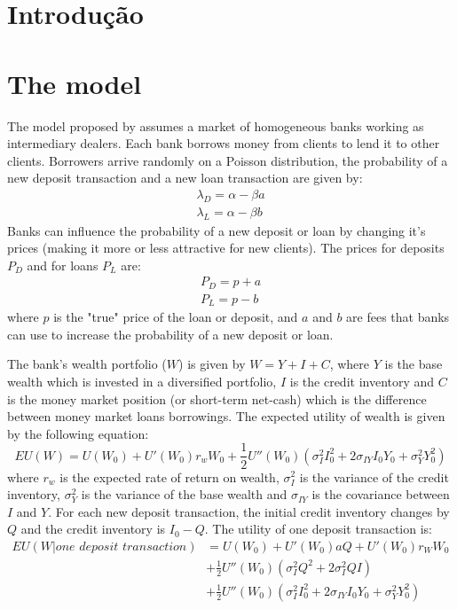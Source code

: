 \chapter{Introdução}


\chapter{The model}\label{cap_trabalho_academico}

The model proposed by  assumes a market of homogeneous banks working as intermediary dealers. Each bank borrows money from clients to lend it to other clients. Borrowers arrive randomly on a Poisson distribution, the probability of a new deposit transaction and a new loan transaction are given by: 
\begin{align}
  \lambda_D = \alpha - \beta a \\
  \lambda_L = \alpha - \beta b
\end{align} 
Banks can influence the probability of a new deposit or loan by changing it's prices (making it more or less attractive for new clients). The prices for deposits $P_D$ and for loans $P_L$ are:
\begin{align}
  P_D = p+a \\
  P_L = p-b 
\end{align}
where $p$ is the "true" price of the loan or deposit, and $a$ and $b$ are fees that banks can use to increase the probability of a new deposit or loan.

The bank's wealth portfolio ($W$) is given by $W = Y + I + C$, where $Y$ is the base wealth which is invested in a diversified portfolio, $I$ is the credit inventory and $C$ is the money market position (or short-term net-cash) which is the difference between money market loans borrowings. The expected utility of wealth is given by the following equation:
\begin{equation}
  EU(W) = U(W_0) + U'(W_0)r_w W_0 + \frac{1}{2}U''(W_0)(\sigma_I^2 I_0^2 + 2\sigma_{IY} I_0 Y_0 + \sigma_Y^2 Y_0^2)
\end{equation}
where $r_w$ is the expected rate of return on wealth, $\sigma_I^2$ is the variance of the credit inventory, $\sigma_Y^2$ is the variance of the base wealth and $\sigma_{IY}$ is the covariance between $I$ and $Y$. For each new deposit transaction, the initial credit inventory changes by $Q$ and the credit inventory is $I_0 - Q$. The utility of one deposit transaction is:
\begin{equation}
  \begin{aligned}
    EU(W|\textit{one deposit transaction}) &= U(W_0) + U'(W_0)aQ +  U'(W_0)r_W W_0 \\ &+ \frac{1}{2}U''(W_0)(\sigma_I^2 Q^2 + 2\sigma_I^2 QI) \\ &+\frac{1}{2}U''(W_0)(\sigma_I^2 I_0^2 + 2\sigma_{IY} I_0 Y_0 + \sigma_Y^2 Y_0^2)
  \end{aligned}
\end{equation}

